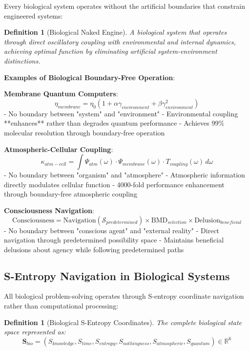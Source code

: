 \documentclass[12pt,a4paper]{article}
\newtheorem{definition}[theorem]{Definition}
\begin{document}
Every biological system operates without the artificial boundaries that constrain engineered systems:

\begin{definition}[Biological Naked Engine]
A biological system that operates through direct oscillatory coupling with environmental and internal dynamics, achieving optimal function by eliminating artificial system-environment distinctions.
\end{definition}

\textbf{Examples of Biological Boundary-Free Operation}:

\textbf{Membrane Quantum Computers}:
\begin{equation}
\eta_{membrane} = \eta_0 \left(1 + \alpha\gamma_{environment} + \beta\gamma_{environment}^2\right)
\end{equation}
- No boundary between "system" and "environment"
- Environmental coupling **enhances** rather than degrades quantum performance
- Achieves 99\% molecular resolution through boundary-free operation

\textbf{Atmospheric-Cellular Coupling}:
\begin{equation}
\kappa_{atm-cell} = \int \Psi_{atm}(\omega) \cdot \Psi_{membrane}(\omega) \cdot T_{coupling}(\omega) \, d\omega
\end{equation}
- No boundary between "organism" and "atmosphere" 
- Atmospheric information directly modulates cellular function
- 4000-fold performance enhancement through boundary-free atmospheric coupling

\textbf{Consciousness Navigation}:
\begin{equation}
\text{Consciousness} = \text{Navigation}(\mathcal{S}_{predetermined}) \times \text{BMD}_{selection} \times \text{Delusion}_{beneficial}
\end{equation}
- No boundary between "conscious agent" and "external reality"
- Direct navigation through predetermined possibility space
- Maintains beneficial delusions about agency while following predetermined paths

\subsection{S-Entropy Navigation in Biological Systems}

All biological problem-solving operates through S-entropy coordinate navigation rather than computational processing:

\begin{definition}[Biological S-Entropy Coordinates]
The complete biological state space represented as:
\begin{equation}
\mathbf{S}_{bio} = (S_{knowledge}, S_{time}, S_{entropy}, S_{nothingness}, S_{atmospheric}, S_{quantum}) \in \mathbb{R}^6
\end{equation}
\end{definition}
\end{document}
